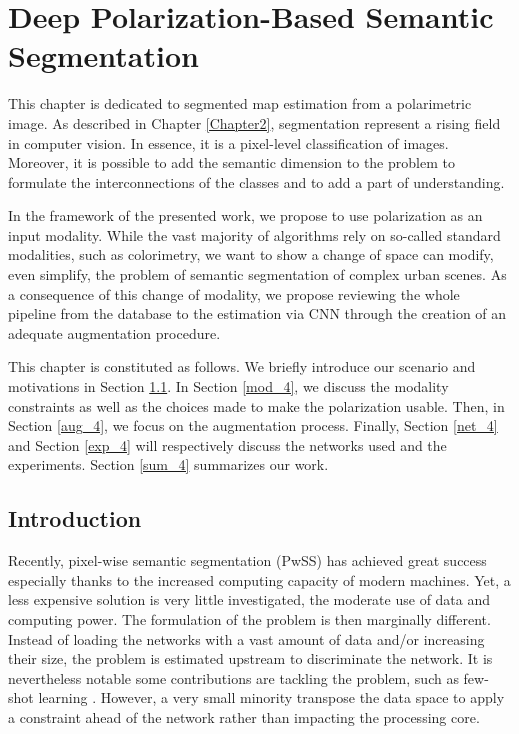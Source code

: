 
\chapter{Deep Polarization-Based Semantic Segmentation} %

\label{Chapter4} %





This chapter is dedicated to segmented map estimation from a polarimetric image. As described in Chapter \ref{Chapter2}, segmentation represent a rising field in computer vision. In essence, it is a pixel-level classification of images. Moreover, it is possible to add the semantic dimension to the problem to formulate the interconnections of the classes and to add a part of understanding.

In the framework of the presented work, we propose to use polarization as an input modality. While the vast majority of algorithms rely on so-called standard modalities, such as colorimetry, we want to show a change of space can modify, even simplify, the problem of semantic segmentation of complex urban scenes.
As a consequence of this change of modality, we propose reviewing the whole pipeline from the database to the estimation via CNN through the creation of an adequate augmentation procedure.

This chapter is constituted as follows. We briefly introduce our scenario and motivations in Section \ref{intro_4}. In Section \ref{mod_4}, we discuss the modality constraints as well as the choices made to make the polarization usable. Then, in Section \ref{aug_4}, we focus on the augmentation process. 
Finally, Section \ref{net_4} and Section \ref{exp_4} will respectively discuss the networks used and the experiments.
Section \ref{sum_4} summarizes our work.

\section{Introduction}\label{intro_4}

Recently, pixel-wise semantic segmentation (PwSS) has achieved great success especially thanks to the increased computing capacity of modern machines. Yet, a less expensive solution is very little investigated, the moderate use of data and computing power. The formulation of the problem is then marginally different. Instead of loading the networks with a vast amount of data and/or increasing their size, the problem is estimated upstream to discriminate the network.
It is nevertheless notable some contributions are tackling the problem, such as few-shot learning \cite{dong2018few, siam2019amp}. However, a very small minority transpose the data space to apply a constraint ahead of the network rather than impacting the processing core.

